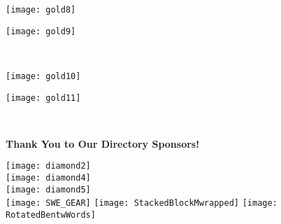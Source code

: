 \documentclass[twoside]{article}
\begin{document}
\begin{center}
        \hspace{1em}\begin{minipage}{0.3\textwidth}\begin{center}\texttt{[image: gold8]}\vfill\end{center}\end{minipage}
        \hspace{1em}\begin{minipage}{0.3\textwidth}\begin{center}\texttt{[image: gold9]}\vfill\end{center}\end{minipage}
        \\
            \begin{minipage}{0.3\textwidth}\begin{center}\texttt{[image: gold10]}\vfill\end{center}\end{minipage}
        \hspace{1em}\begin{minipage}{0.3\textwidth}\begin{center}\texttt{[image: gold11]}\vfill\end{center}\end{minipage}
        \\
            \end{center}
    \newpage
    \backcover
    { \fontsize{16}{19}\selectfont \bf Thank You to Our Directory Sponsors!}\\
    \begin{center}
    \texttt{[image: diamond2]}\\[3em]
        \texttt{[image: diamond4]}\\[3em]
        \texttt{[image: diamond5]}\\[3em]
        \texttt{[image: SWE\_GEAR]}\hspace{3em}
    \texttt{[image: StackedBlockMwrapped]}\hspace{3em}
    \texttt{[image: RotatedBentwWords]}
    \end{center}
    
\end{document}
